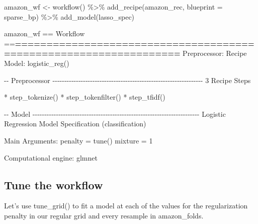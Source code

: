 \documentclass[
]{article}
\newenvironment{Shaded}{}{}
\newcommand{\AttributeTok}[1]{\textcolor[rgb]{0.49,0.56,0.16}{#1}}
\newcommand{\DecValTok}[1]{\textcolor[rgb]{0.25,0.63,0.44}{#1}}
\newcommand{\ErrorTok}[1]{\textcolor[rgb]{1.00,0.00,0.00}{\textbf{#1}}}
\newcommand{\FunctionTok}[1]{\textcolor[rgb]{0.02,0.16,0.49}{#1}}
\newcommand{\NormalTok}[1]{#1}
\newcommand{\OtherTok}[1]{\textcolor[rgb]{0.00,0.44,0.13}{#1}}
\newcommand{\SpecialCharTok}[1]{\textcolor[rgb]{0.25,0.44,0.63}{#1}}
\begin{document}
\begin{Shaded}
\begin{Highlighting}[]
\NormalTok{amazon\_wf }\OtherTok{\textless{}{-}} \FunctionTok{workflow}\NormalTok{() }\SpecialCharTok{\%\textgreater{}\%}
    \FunctionTok{add\_recipe}\NormalTok{(amazon\_rec, }\AttributeTok{blueprint =}\NormalTok{ sparse\_bp) }\SpecialCharTok{\%\textgreater{}\%}
    \FunctionTok{add\_model}\NormalTok{(lasso\_spec)}

\NormalTok{amazon\_wf}
\SpecialCharTok{==}\NormalTok{ Workflow }\SpecialCharTok{==}\ErrorTok{==================================================================}
\NormalTok{Preprocessor}\SpecialCharTok{:}\NormalTok{ Recipe}
\NormalTok{Model}\SpecialCharTok{:} \FunctionTok{logistic\_reg}\NormalTok{()}

\SpecialCharTok{{-}{-}}\NormalTok{ Preprocessor }\SpecialCharTok{{-}{-}{-}{-}{-}{-}{-}{-}{-}{-}{-}{-}{-}{-}{-}{-}{-}{-}{-}{-}{-}{-}{-}{-}{-}{-}{-}{-}{-}{-}{-}{-}{-}{-}{-}{-}{-}{-}{-}{-}{-}{-}{-}{-}{-}{-}{-}{-}{-}{-}{-}{-}{-}{-}{-}{-}{-}{-}{-}{-}{-}{-}{-}{-}}
\DecValTok{3}\NormalTok{ Recipe Steps}

\SpecialCharTok{*} \FunctionTok{step\_tokenize}\NormalTok{()}
\SpecialCharTok{*} \FunctionTok{step\_tokenfilter}\NormalTok{()}
\SpecialCharTok{*} \FunctionTok{step\_tfidf}\NormalTok{()}

\SpecialCharTok{{-}{-}}\NormalTok{ Model }\SpecialCharTok{{-}{-}{-}{-}{-}{-}{-}{-}{-}{-}{-}{-}{-}{-}{-}{-}{-}{-}{-}{-}{-}{-}{-}{-}{-}{-}{-}{-}{-}{-}{-}{-}{-}{-}{-}{-}{-}{-}{-}{-}{-}{-}{-}{-}{-}{-}{-}{-}{-}{-}{-}{-}{-}{-}{-}{-}{-}{-}{-}{-}{-}{-}{-}{-}{-}{-}{-}{-}{-}{-}{-}}
\NormalTok{Logistic Regression Model }\FunctionTok{Specification}\NormalTok{ (classification)}

\NormalTok{Main Arguments}\SpecialCharTok{:}
\NormalTok{  penalty }\OtherTok{=} \FunctionTok{tune}\NormalTok{()}
\NormalTok{  mixture }\OtherTok{=} \DecValTok{1}

\NormalTok{Computational engine}\SpecialCharTok{:}\NormalTok{ glmnet }
\end{Highlighting}
\end{Shaded}

\newpage

\hypertarget{tune-the-workflow}{%
\subsection{Tune the workflow}\label{tune-the-workflow}}

Let's use tune\_grid() to fit a model at each of the values for the
regularization penalty in our regular grid and every resample in
amazon\_folds.
\end{document}
